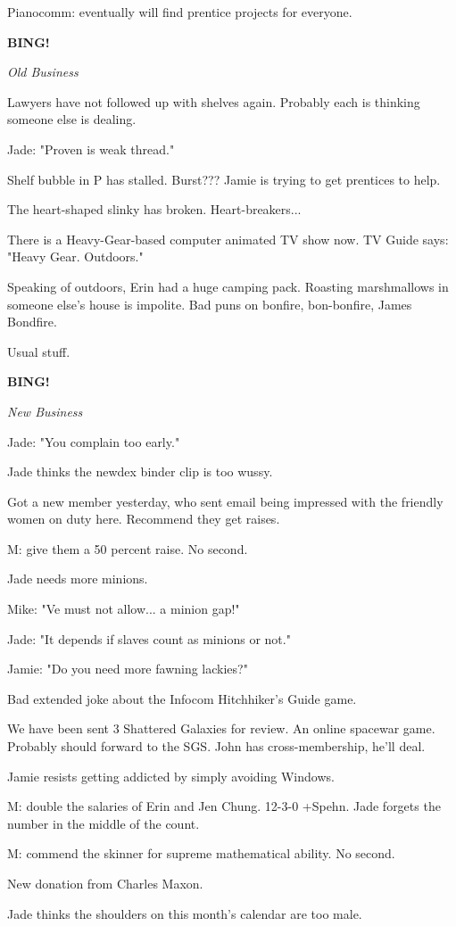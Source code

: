 \documentclass[12pt]{article}
\newcommand{\bing}{{\bf BING!} }
\newcommand{\goto}[1]{\bing \vskip 12pt \centerline{{\em{#1}}}}
\begin{document}
Pianocomm: eventually will find prentice projects for everyone.

\goto{Old Business}

Lawyers have not followed up with shelves again. Probably each is thinking someone else is dealing.

Jade: "Proven is weak thread."

Shelf bubble in P has stalled. Burst??? Jamie is trying to get prentices to help.

The heart-shaped slinky has broken. Heart-breakers...

There is a Heavy-Gear-based computer animated TV show now. TV Guide says: "Heavy Gear. Outdoors."

Speaking of outdoors, Erin had a huge camping pack. Roasting marshmallows in someone else's house is impolite. Bad puns on bonfire, bon-bonfire, James Bondfire.

Usual stuff.

\goto{New Business}

Jade: "You complain too early."

Jade thinks the newdex binder clip is too wussy.

Got a new member yesterday, who sent email being impressed with the friendly women on duty here. Recommend they get raises.

M: give them a 50 percent raise. No second.

Jade needs more minions.

Mike: "Ve must not allow... a minion gap!"

Jade: "It depends if slaves count as minions or not."

Jamie: "Do you need more fawning lackies?"

Bad extended joke about the Infocom Hitchhiker's Guide game.

We have been sent 3 Shattered Galaxies for review. An online spacewar game. Probably should forward to the SGS. John has cross-membership, he'll deal.

Jamie resists getting addicted by simply avoiding Windows.

M: double the salaries of Erin and Jen Chung. 12-3-0 +Spehn. Jade forgets the number in the middle of the count.

M: commend the skinner for supreme mathematical ability. No second.

New donation from Charles Maxon.

Jade thinks the shoulders on this month's calendar are too male.
\end{document}
